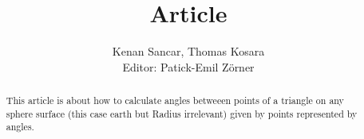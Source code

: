 \documentclass[12pt, a4paper, twoside, titlepage]{article}
\title{Article}
\author{Kenan Sancar, Thomas Kosara\\Editor: Patick-Emil Zörner}
\begin{document}
\maketitle
\begin{abstract}
    This article is about how to calculate angles betweeen points of a triangle on any sphere surface (this case earth but Radius irrelevant) given by points represented by angles.
\end{abstract}


\end{document}
